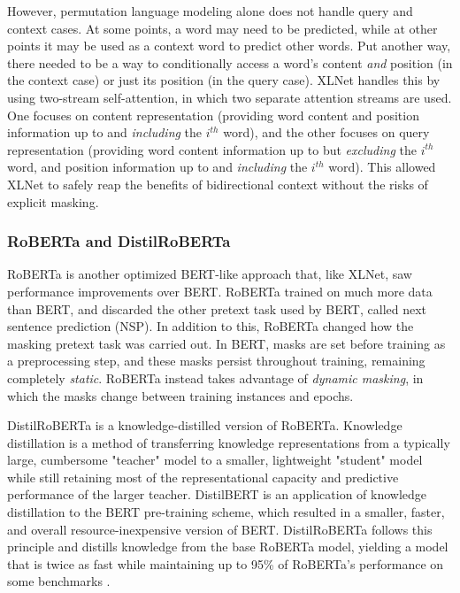 \documentclass[11pt,a4paper]{article}
\begin{document}
However, permutation language modeling alone does not handle query and context cases. At some points, a word may need to be predicted, while at other points it may be used as a context word to predict other words. Put another way, there needed to be a way to conditionally access a word's content \textit{and} position (in the context case) or just its position (in the query case). XLNet handles this by using two-stream self-attention, in which two separate attention streams are used. One focuses on content representation (providing word content and position information up to and \textit{including} the $i^{th}$ word), and the other focuses on query representation (providing word content information up to but \textit{excluding} the $i^{th}$ word, and position information up to and \textit{including} the $i^{th}$ word). This allowed XLNet to safely reap the benefits of bidirectional context without the risks of explicit masking.

\subsubsection{RoBERTa and DistilRoBERTa}

RoBERTa \cite{roberta} is another optimized BERT-like approach that, like XLNet, saw performance improvements over BERT. RoBERTa trained on much more data than BERT, and discarded the other pretext task used by BERT, called next sentence prediction (NSP). In addition to this, RoBERTa changed how the masking pretext task was carried out. In BERT, masks are set before training as a preprocessing step, and these masks persist throughout training, remaining completely \textit{static}. RoBERTa instead takes advantage of \textit{dynamic masking}, in which the masks change between training instances and epochs.

DistilRoBERTa is a knowledge-distilled version of RoBERTa. Knowledge distillation \cite{knowledge-distillation} is a method of transferring knowledge representations from a typically large, cumbersome "teacher" model to a smaller, lightweight "student" model while still retaining most of the representational capacity and predictive performance of the larger teacher. DistilBERT \cite{distilbert} is an application of knowledge distillation to the BERT pre-training scheme, which resulted in a smaller, faster, and overall resource-inexpensive version of BERT. DistilRoBERTa follows this principle and distills knowledge from the base RoBERTa model, yielding a model that is twice as fast while maintaining up to 95\% of RoBERTa's performance on some benchmarks \cite{distilroberta-eval}.
\end{document}
